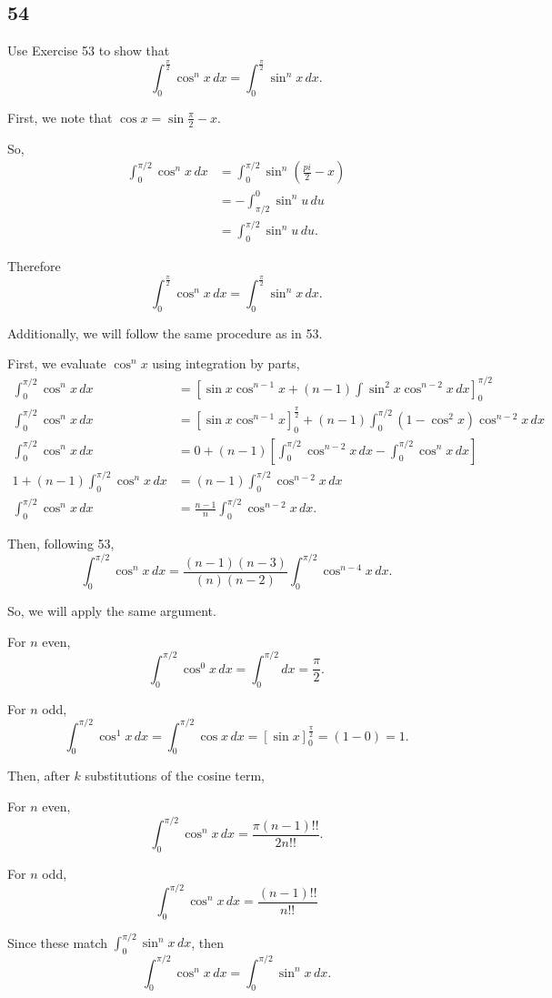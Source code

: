 \documentclass[../hw8]{subfiles}
\begin{document}
\subsection*{54}
Use Exercise 53 to show that
\[\int_{0}^{\frac{\pi}{2}} \cos^n{x}\,dx = \int_{0}^{\frac{\pi}{2}} \sin^n{x}\,dx.\]

First, we note that $\cos{x}=\sin{\frac{\pi}{2}-x}$.

So,
\begin{align*}
    \int_{0}^{\pi/2} \cos^n{x}\,dx &= \int_{0}^{\pi/2} \sin^n{(\frac{pi}{2}-x)} \\
    &= -\int_{\pi/2}^{0}\sin^n{u}\,du \\
    &= \int_{0}^{\pi/2} \sin^n{u}\,du.
\end{align*}

Therefore \[\int_{0}^{\frac{\pi}{2}} \cos^n{x}\,dx = \int_{0}^{\frac{\pi}{2}} \sin^n{x}\,dx.\]

Additionally, we will follow the same procedure as in 53. 

First, we evaluate $\cos^n{x}$ using integration by parts,
\begin{align*}
    \int_{0}^{\pi/2} \cos^n{x}\,dx &= {\left[ \sin{x}\cos^{n-1}{x}+(n-1)\int\sin^2{x}\cos^{n-2}{x}\,dx \right]}_{0}^{\pi/2} \\
    \int_{0}^{\pi/2} \cos^n{x}\,dx &= {\left[ \sin{x}\cos^{n-1}{x} \right]}_{0}^{\frac{\pi}{2}} + (n-1) \int_{0}^{\pi/2} \left( 1-\cos^2{x} \right) \cos^{n-2}{x}\,dx \\
    \int_{0}^{\pi/2} \cos^n{x}\,dx &= 0 + (n-1)\left[ \int_{0}^{\pi/2} \cos^{n-2}{x}\,dx - \int_{0}^{\pi/2} \cos^n{x}\,dx \right] \\
    1+(n-1) \int_{0}^{\pi/2} \cos^n{x}\,dx &= (n-1)\int_{0}^{\pi/2} \cos^{n-2}{x}\,dx \\
    \int_{0}^{\pi/2} \cos^n{x}\,dx &= \frac{n-1}{n} \int_{0}^{\pi/2} \cos^{n-2}{x}\,dx. 
\end{align*}

Then, following 53,
\[\int_{0}^{\pi/2} \cos^n{x}\,dx = \frac{(n-1)(n-3)}{(n)(n-2)}\int_{0}^{\pi/2} \cos^{n-4}{x}\,dx.\]

So, we will apply the same argument.

For $n$ even, \[\int_{0}^{\pi/2} \cos^{0}{x}\,dx = \int_{0}^{\pi/2}dx = \frac{\pi}{2}.\]

For $n$ odd, \[\int_{0}^{\pi/2} \cos^{1}{x}\,dx = \int_{0}^{\pi/2} \cos{x}\,dx = [\sin{x}]_{0}^{\frac{\pi}{2}}=(1-0)=1.\]

Then, after $k$ substitutions of the cosine term, 

For $n$ even, \[\int_{0}^{\pi/2} \cos^n{x}\,dx = \frac{\pi(n-1)!!}{2n!!}.\]

For $n$ odd, \[\int_{0}^{\pi/2} \cos^n{x}\,dx = \frac{(n-1)!!}{n!!}\]

Since these match $\int_{0}^{\pi/2} \sin^n{x}\,dx$, then
\[\int_{0}^{\pi/2} \cos^n{x}\,dx=\int_{0}^{\pi/2} \sin^n{x}\,dx.\]
\end{document}
